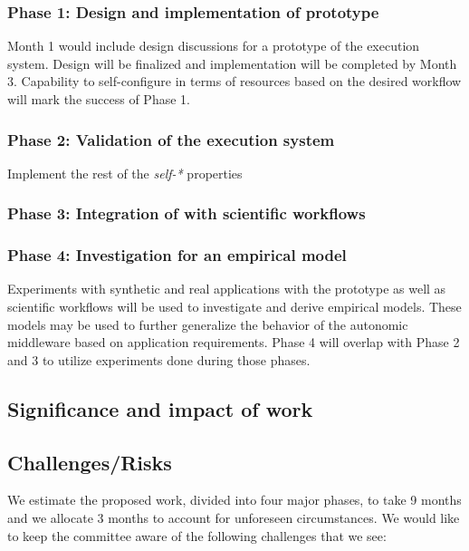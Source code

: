 \subsubsection{Phase 1: Design and implementation of prototype}

Month 1 would include design discussions for a prototype of the execution system. Design will be finalized and implementation will be completed by Month 3. Capability to self-configure in terms of resources based on the desired workflow will mark the success of Phase 1.

\subsubsection{Phase 2: Validation of the execution system}

Implement the rest of the \textit{self-*} properties

\subsubsection{Phase 3: Integration of with scientific workflows}


\subsubsection{Phase 4: Investigation for an empirical model}

Experiments with synthetic and real applications with the prototype as well as scientific workflows will be used to investigate and derive empirical models. These models may be used to further generalize the behavior of the autonomic middleware based on application requirements. Phase 4 will overlap with Phase 2 and 3 to utilize experiments done during those phases.

\subsection{Significance and impact of work}


\subsection{Challenges/Risks}

We estimate the proposed work, divided into four major phases, to take 9 months and we allocate 3 months to account for unforeseen circumstances. We would like to keep the committee aware of the following challenges that we see:

